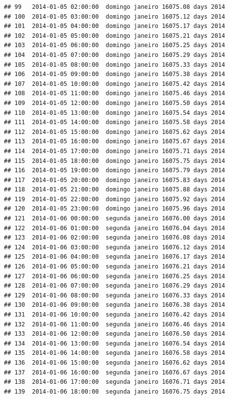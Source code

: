 \documentclass[]{book}
\begin{document}
\begin{verbatim}
## 99   2014-01-05 02:00:00  domingo janeiro 16075.08 days 2014
## 100  2014-01-05 03:00:00  domingo janeiro 16075.12 days 2014
## 101  2014-01-05 04:00:00  domingo janeiro 16075.17 days 2014
## 102  2014-01-05 05:00:00  domingo janeiro 16075.21 days 2014
## 103  2014-01-05 06:00:00  domingo janeiro 16075.25 days 2014
## 104  2014-01-05 07:00:00  domingo janeiro 16075.29 days 2014
## 105  2014-01-05 08:00:00  domingo janeiro 16075.33 days 2014
## 106  2014-01-05 09:00:00  domingo janeiro 16075.38 days 2014
## 107  2014-01-05 10:00:00  domingo janeiro 16075.42 days 2014
## 108  2014-01-05 11:00:00  domingo janeiro 16075.46 days 2014
## 109  2014-01-05 12:00:00  domingo janeiro 16075.50 days 2014
## 110  2014-01-05 13:00:00  domingo janeiro 16075.54 days 2014
## 111  2014-01-05 14:00:00  domingo janeiro 16075.58 days 2014
## 112  2014-01-05 15:00:00  domingo janeiro 16075.62 days 2014
## 113  2014-01-05 16:00:00  domingo janeiro 16075.67 days 2014
## 114  2014-01-05 17:00:00  domingo janeiro 16075.71 days 2014
## 115  2014-01-05 18:00:00  domingo janeiro 16075.75 days 2014
## 116  2014-01-05 19:00:00  domingo janeiro 16075.79 days 2014
## 117  2014-01-05 20:00:00  domingo janeiro 16075.83 days 2014
## 118  2014-01-05 21:00:00  domingo janeiro 16075.88 days 2014
## 119  2014-01-05 22:00:00  domingo janeiro 16075.92 days 2014
## 120  2014-01-05 23:00:00  domingo janeiro 16075.96 days 2014
## 121  2014-01-06 00:00:00  segunda janeiro 16076.00 days 2014
## 122  2014-01-06 01:00:00  segunda janeiro 16076.04 days 2014
## 123  2014-01-06 02:00:00  segunda janeiro 16076.08 days 2014
## 124  2014-01-06 03:00:00  segunda janeiro 16076.12 days 2014
## 125  2014-01-06 04:00:00  segunda janeiro 16076.17 days 2014
## 126  2014-01-06 05:00:00  segunda janeiro 16076.21 days 2014
## 127  2014-01-06 06:00:00  segunda janeiro 16076.25 days 2014
## 128  2014-01-06 07:00:00  segunda janeiro 16076.29 days 2014
## 129  2014-01-06 08:00:00  segunda janeiro 16076.33 days 2014
## 130  2014-01-06 09:00:00  segunda janeiro 16076.38 days 2014
## 131  2014-01-06 10:00:00  segunda janeiro 16076.42 days 2014
## 132  2014-01-06 11:00:00  segunda janeiro 16076.46 days 2014
## 133  2014-01-06 12:00:00  segunda janeiro 16076.50 days 2014
## 134  2014-01-06 13:00:00  segunda janeiro 16076.54 days 2014
## 135  2014-01-06 14:00:00  segunda janeiro 16076.58 days 2014
## 136  2014-01-06 15:00:00  segunda janeiro 16076.62 days 2014
## 137  2014-01-06 16:00:00  segunda janeiro 16076.67 days 2014
## 138  2014-01-06 17:00:00  segunda janeiro 16076.71 days 2014
## 139  2014-01-06 18:00:00  segunda janeiro 16076.75 days 2014

\end{verbatim}
\end{document}

